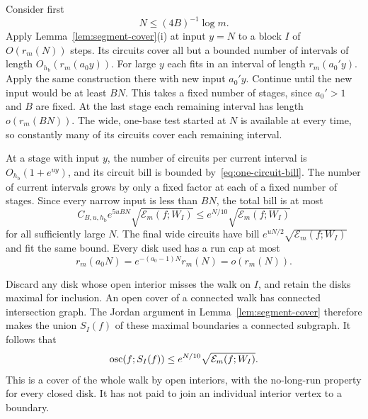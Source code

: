 Consider first
\begin{equation}
\label{eq:coarse-range}
 N\le (4B)^{-1}\log m.
\end{equation}
Apply Lemma~\ref{lem:segment-cover}(i) at input \(y=N\) to a
block \(I\) of \(O(r_m(N))\) steps.  Its circuits cover all
but a bounded number of intervals of length
\(O_{h_{\mathrm b}}(r_m(a_0y))\).  For large \(y\) each fits
in an interval of length \(r_m(a_0'y)\).  Apply the same
construction there with new input \(a_0'y\).  Continue until
the new input would be at least \(BN\).  This takes a fixed
number of stages, since \(a_0'>1\) and \(B\) are fixed.
At the last stage each remaining interval has length
\(o(r_m(BN))\).  The wide, one-base test started at \(N\)
is available at every time, so constantly many of its
circuits cover each remaining interval.

At a stage with input \(y\), the number of circuits per current
interval is \(O_{h_{\mathrm b}}(1+e^{uy})\), and its circuit
bill is bounded by~\eqref{eq:one-circuit-bill}.  The number
of current intervals grows by only a fixed factor at each
of a fixed number of stages.  Since every narrow input is
less than \(BN\), the total bill is at most
\[
 C_{B,u,h_{\mathrm b}}e^{5uBN}
       \sqrt{\mathcal E_m(f;W_I)}
 \le e^{N/10}\sqrt{\mathcal E_m(f;W_I)}
\]
for all sufficiently large \(N\).  The final wide circuits
have bill \(e^{uN/2}\sqrt{\mathcal E_m(f;W_I)}\) and fit the
same bound.  Every disk used has a run cap at most
\[
 r_m(a_0N)=e^{-(a_0-1)N}r_m(N)=o(r_m(N)).
\]

Discard any disk whose open interior misses the walk on \(I\),
and retain the disks maximal for inclusion.  An open cover of
a connected walk has connected intersection graph.  The
Jordan argument in Lemma~\ref{lem:segment-cover} therefore
makes the union \(S_I(f)\) of these maximal boundaries a
connected subgraph.  It follows that
\begin{equation}
\label{eq:boundary-oscillation}
 \operatorname{osc}(f;S_I(f))
 \le e^{N/10}\sqrt{\mathcal E_m(f;W_I)}.
\end{equation}
This is a cover of the whole walk by open interiors, with the
no-long-run property for every closed disk.  It has not paid
to join an individual interior vertex to a boundary.

